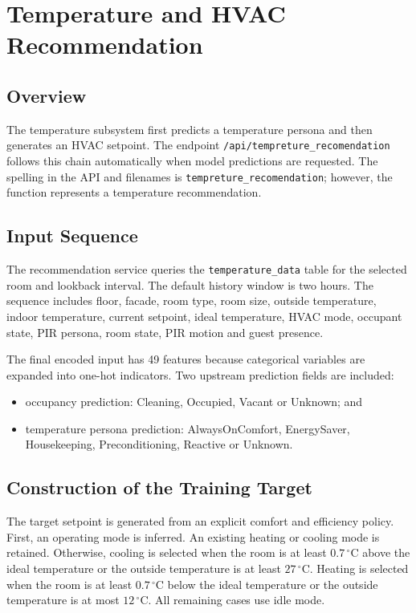 \chapter{Temperature and HVAC Recommendation}
\label{chap:temperature-recommendation}

\section{Overview}

The temperature subsystem first predicts a temperature persona and then
generates an HVAC setpoint. The endpoint
\texttt{/api/tempreture\_recomendation} follows this chain automatically when
model predictions are requested. The spelling in the API and filenames is
\texttt{tempreture\_recomendation}; however, the function represents a
temperature recommendation.

\section{Input Sequence}

The recommendation service queries the \texttt{temperature\_data} table for
the selected room and lookback interval. The default history window is two
hours. The sequence includes floor, facade, room type, room size, outside
temperature, indoor temperature, current setpoint, ideal temperature, HVAC
mode, occupant state, PIR persona, room state, PIR motion and guest presence.

The final encoded input has 49 features because categorical variables are
expanded into one-hot indicators. Two upstream prediction fields are included:

\begin{itemize}
    \item occupancy prediction: Cleaning, Occupied, Vacant or Unknown; and
    \item temperature persona prediction: AlwaysOnComfort, EnergySaver,
    Housekeeping, Preconditioning, Reactive or Unknown.
\end{itemize}

\section{Construction of the Training Target}

The target setpoint is generated from an explicit comfort and efficiency
policy. First, an operating mode is inferred. An existing heating or cooling
mode is retained. Otherwise, cooling is selected when the room is at least
$0.7\,^{\circ}\mathrm{C}$ above the ideal temperature or the outside
temperature is at least $27\,^{\circ}\mathrm{C}$. Heating is selected when the
room is at least $0.7\,^{\circ}\mathrm{C}$ below the ideal temperature or the
outside temperature is at most $12\,^{\circ}\mathrm{C}$. All remaining cases
use idle mode.

